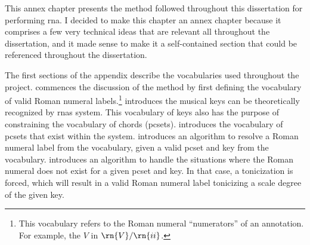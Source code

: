 
This annex chapter presents the method followed throughout
this dissertation for performing \gls{rna}. I decided to
make this chapter an annex chapter because it comprises a
few very technical ideas that are relevant all throughout
the dissertation, and it made sense to make it a
self-contained section that could be referenced throughout
the dissertation.

The first sections of the appendix describe the vocabularies
used throughout the project.
 commences the
discussion of the method by first defining the vocabulary of
valid Roman numeral labels.\footnote{This vocabulary refers
to the Roman numeral ``numerators'' of an annotation. For
example, the $V$ in $\rn{V}/\rn{ii}$.}
 introduces the musical
keys can be theoretically recognized by \glspl{rna} system.
This vocabulary of keys also has the purpose of constraining
the vocabulary of chords (\gls{pcset}s).
 introduces the
vocabulary of \gls{pcset}s that exist within the system.
introduces an algorithm to resolve a Roman numeral label
from the vocabulary, given a valid \gls{pcset} and key from
the vocabulary. 
introduces an algorithm to handle the situations where the
Roman numeral does not exist for a given \gls{pcset} and
key. In that case, a tonicization is forced, which will
result in a valid Roman numeral label tonicizing a scale
degree of the given key.
